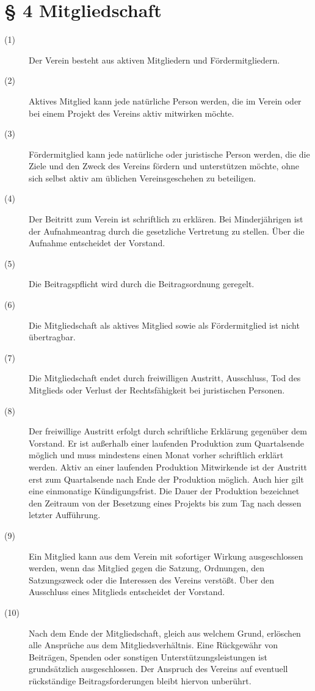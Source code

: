 \documentclass[a4paper,12pt]{scrartcl}
\begin{document}
\section*{\S{} 4 Mitgliedschaft}
\begin{description} 

\item[(1)] Der Verein besteht aus aktiven Mitgliedern und Fördermitgliedern.
\item[(2)] Aktives Mitglied kann jede natürliche Person werden, die im Verein oder bei einem Projekt des Vereins aktiv mitwirken möchte.
\item[(3)] Fördermitglied kann jede natürliche oder juristische Person werden, die die Ziele und den Zweck des Vereins fördern und unterstützen möchte, ohne sich selbst aktiv am üblichen Vereinsgeschehen zu beteiligen.
\item[(4)] Der Beitritt zum Verein ist schriftlich zu erklären. Bei Minderjährigen ist der Aufnahmeantrag durch die gesetzliche Vertretung zu stellen. Über die Aufnahme entscheidet der Vorstand.
\item[(5)] Die Beitragspflicht wird durch die Beitragsordnung geregelt.
\item[(6)] Die Mitgliedschaft als aktives Mitglied sowie als Fördermitglied ist nicht übertragbar. 
\item[(7)] Die Mitgliedschaft endet durch freiwilligen Austritt, Ausschluss, Tod des Mitglieds oder Verlust der Rechtsfähigkeit bei juristischen Personen. 
\item[(8)] Der freiwillige Austritt erfolgt durch schriftliche Erklärung gegenüber dem Vorstand. Er ist außerhalb einer laufenden Produktion zum Quartalsende möglich und muss mindestens einen Monat vorher schriftlich erklärt werden. Aktiv an einer laufenden Produktion Mitwirkende ist der Austritt erst zum Quartalsende nach Ende der Produktion möglich. Auch hier gilt eine einmonatige Kündigungsfrist. Die Dauer der Produktion bezeichnet den Zeitraum von der Besetzung eines Projekts bis zum Tag nach dessen letzter Aufführung.
\item[(9)] Ein Mitglied kann aus dem Verein mit sofortiger Wirkung ausgeschlossen werden, wenn das Mitglied gegen die Satzung, Ordnungen, den Satzungszweck oder die Interessen des Vereins verstößt. Über den Ausschluss eines Mitglieds entscheidet der Vorstand.
\item[(10)] Nach dem Ende der Mitgliedschaft, gleich aus welchem Grund, erlöschen alle Ansprüche aus dem Mitgliedsverhältnis. Eine Rückgewähr von Beiträgen, Spenden oder sonstigen Unterstützungsleistungen ist grundsätzlich ausgeschlossen. Der Anspruch des Vereins auf eventuell rückständige Beitragsforderungen bleibt hiervon unberührt.

\end{description}
\end{document}
